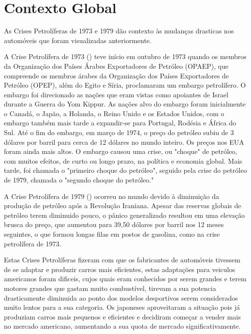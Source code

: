 \documentclass[a4paper]{article}
\begin{document}
\section{Contexto Global}\label{cg}
As Crises Petrolíferas de 1973 e 1979 dão contexto às mudanças drasticas nos automóveis que foram visualizadas anteriormente.

A Crise Petrolífera de 1973 (\cite{pet73}) teve início em outubro de 1973 quando os membros da 
Organização dos Países Árabes Exportadores de Petróleo (OPAEP), que compreende os membros árabes da 
Organização dos Países Exportadores de Petróleo (OPEP), além do Egito e Síria, proclamaram um embargo petrolífero. 
O embargo foi direcionado as nações que eram vistas como apoiantes de Israel durante a Guerra do Yom Kippur. 
As nações alvo do embargo foram inicialmente o Canadá, o Japão, a Holanda, o Reino Unido e os Estados Unidos, 
com o embargo também mais tarde a expandir-se para Portugal, Rodésia e África do Sul. Até o fim do embargo, em março de 1974, 
o preço do petróleo subiu de 3 dólares por barril para cerca de 12 dólares no mundo inteiro. Os preços nos EUA foram ainda mais altos. 
O embargo causou uma crise, ou "choque" de petróleo, com muitos efeitos, de curto ou longo prazo, na política e economia global. 
Mais tarde, foi chamada o "primeiro choque do petróleo", seguido pela crise do petróleo de 1979, chamada o "segundo choque do petróleo."

A Crise Petrolífera de 1979 (\cite{pet79}) ocorreu no mundo devido à diminuição da produção de petróleo após a Revolução Iraniana. 
Apesar das reservas globais de petróleo terem diminuido pouco, o pânico generalizado resultou em uma elevação brusca do preço, 
que aumentou para 39,50 dólares por barril nos 12 meses seguintes, o que formou longas filas em postos de gasolina, como na crise petrolífera de 1973.

Estas Crises Petrolíferas fizeram com que os fabricantes de automóveis tivessem de se adaptar e produzir carros mais eficientes, estas adaptações para 
veiculos americanos foram dificeis, cujos quais eram conhecidos por serem grandes e terem motores grandes que gastam muito combustível,
tirevam a sua potencia drasticamente diminuida ao ponto dos modelos desportivos serem considerados muito lentos para a sua categoria.
Os japoneses aproveitaram a situação pois já produziam carros mais pequenos e eficientes e decidiram começar a vender mais no mercado americano,
aumentando a sua quota de mercado significativamente.

\newpage
\renewcommand{\refname}{Bibliografia} %
\renewcommand{\bibname}{Bibliografia} %
\printbibliography
\end{document}
